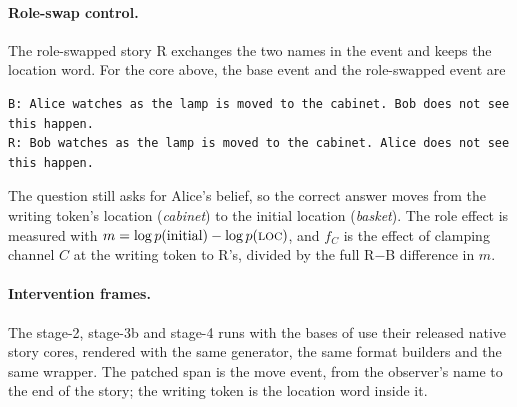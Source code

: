 \paragraph{Role-swap control.} The role-swapped story R exchanges the two names in the event and keeps the location word. For the core above, the base event and the role-swapped event are
{\small
\begin{verbatim}
B: Alice watches as the lamp is moved to the cabinet. Bob does not see this happen.
R: Bob watches as the lamp is moved to the cabinet. Alice does not see this happen.
\end{verbatim}
}
The question still asks for Alice's belief, so the correct answer moves from the writing token's location (\emph{cabinet}) to the initial location (\emph{basket}). The role effect is measured with $m = \log p(\text{initial}) - \log p(\textsc{loc})$, and $f_C$ is the effect of clamping channel $C$ at the writing token to R's, divided by the full R$-$B difference in $m$.

\paragraph{Intervention frames.} The stage-2, stage-3b and stage-4 runs with the bases of \citet{anonymous2026fitted} use their released native story cores, rendered with the same generator, the same format builders and the same wrapper. The patched span is the move event, from the observer's name to the end of the story; the writing token is the location word inside it.

